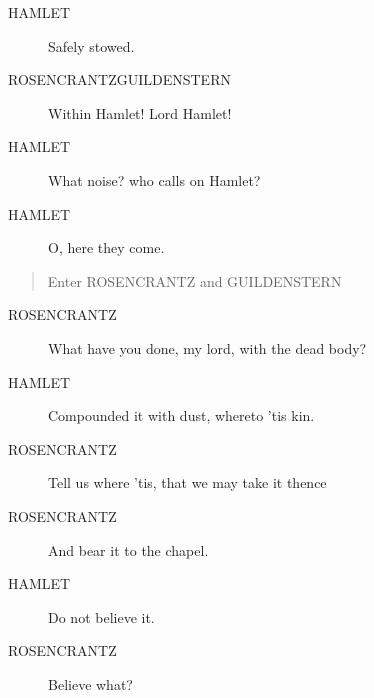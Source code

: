 \documentclass{article}
\begin{document}
\begin{description}
            
\item[HAMLET] Safely stowed.
\end{description}
          
\begin{description}
            
\item[ROSENCRANTZGUILDENSTERN] 
               Within  Hamlet! Lord Hamlet!
\end{description}
          
\begin{description}
            
\item[HAMLET] What noise? who calls on Hamlet?
\item[HAMLET] O, here they come.
\end{description}
          
\begin{quote}
Enter ROSENCRANTZ and GUILDENSTERN
\end{quote}
          
\begin{description}
            
\item[ROSENCRANTZ] What have you done, my lord, with the dead body?
\end{description}
          
\begin{description}
            
\item[HAMLET] Compounded it with dust, whereto 'tis kin.
\end{description}
          
\begin{description}
            
\item[ROSENCRANTZ] Tell us where 'tis, that we may take it thence
\item[ROSENCRANTZ] And bear it to the chapel.
\end{description}
          
\begin{description}
            
\item[HAMLET] Do not believe it.
\end{description}
          
\begin{description}
            
\item[ROSENCRANTZ] Believe what?
\end{description}
          
\end{document}
